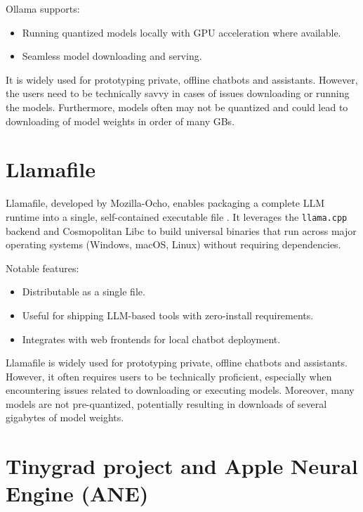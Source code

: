 Ollama supports:
\begin{itemize}
    \item Running quantized models locally with GPU acceleration where available.
    \item Seamless model downloading and serving.
\end{itemize}

It is widely used for prototyping private, offline chatbots and assistants. However, the users need to be technically savvy in cases of issues downloading or running the models. Furthermore, models often may not be quantized and could lead to downloading of model weights in order of many GBs.


\section{Llamafile}
\label{sec:llamafile}


Llamafile, developed by Mozilla-Ocho, enables packaging a complete LLM runtime into a single, self-contained executable file \cite{llamafile}. It leverages the \texttt{llama.cpp} backend and Cosmopolitan Libc to build universal binaries that run across major operating systems (Windows, macOS, Linux) without requiring dependencies.

Notable features:
\begin{itemize}
    \item Distributable as a single file.
    \item Useful for shipping LLM-based tools with zero-install requirements.
    \item Integrates with web frontends for local chatbot deployment.
\end{itemize}

Llamafile is widely used for prototyping private, offline chatbots and assistants. However, it often requires users to be technically proficient, especially when encountering issues related to downloading or executing models. Moreover, many models are not pre-quantized, potentially resulting in downloads of several gigabytes of model weights.
\section{Tinygrad project and Apple Neural Engine (ANE)}
\label{sec:ANEAPI}

